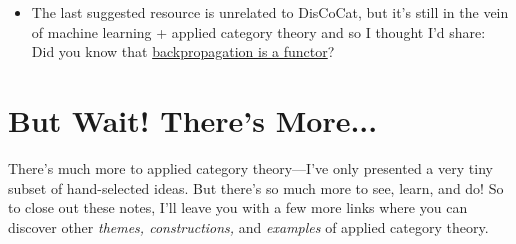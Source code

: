 \documentclass{tufte-handout-tai}
\theoremstyle{plain}
\theoremstyle{definition}
\theoremstyle{remark}
\begin{document}
\begin{itemize}
	\item The last suggested resource is unrelated to DisCoCat, but it's still in the vein of machine learning + applied category theory and so I thought I'd share: Did you know that \href{https://arxiv.org/pdf/1711.10455.pdf}{backpropagation is a functor}?
\end{itemize}


\newpage
\section{But Wait! There's More...}
There's much more to applied category theory---I've only presented a very tiny subset of hand-selected ideas. But there's so much more to see, learn, and do! So to close out these notes, I'll leave you with a few more links where you can discover other \textit{themes, constructions,} and \textit{examples} of applied category theory. 
\end{document}
